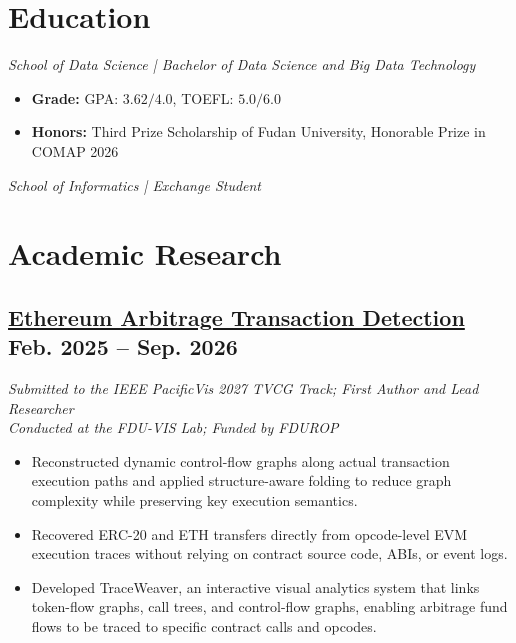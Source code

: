 \documentclass{resume}
\begin{document}



\section{Education}

\textit{School of Data Science \quad | \quad Bachelor of Data Science and Big Data Technology}
\begin{itemize}
  \item \textbf{Grade:} GPA: $3.62/4.0$, TOEFL: $5.0/6.0$
  \item \textbf{Honors:} Third Prize Scholarship of Fudan University, Honorable Prize in COMAP 2026
\end{itemize}

\textit{School of Informatics \quad | \quad Exchange Student}

\section{Academic Research}
\subsection{\textbf{\href{https://github.com/OB-David/evm-transaction-analyzer}{Ethereum Arbitrage Transaction Detection}} \hfill Feb. 2025 -- Sep. 2026} 
\textit{Submitted to the IEEE PacificVis 2027 TVCG Track; First Author and Lead Researcher}\\
\textit{Conducted at the FDU-VIS Lab; Funded by FDUROP}
\begin{itemize}[parsep=0.2ex]
  \item Reconstructed dynamic control-flow graphs along actual transaction execution paths and applied structure-aware folding to reduce graph complexity while preserving key execution semantics.
  \item Recovered ERC-20 and ETH transfers directly from opcode-level EVM execution traces without relying on contract source code, ABIs, or event logs.
  \item Developed TraceWeaver, an interactive visual analytics system that links token-flow graphs, call trees, and control-flow graphs, enabling arbitrage fund flows to be traced to specific contract calls and opcodes.
\end{itemize}
\end{document}

